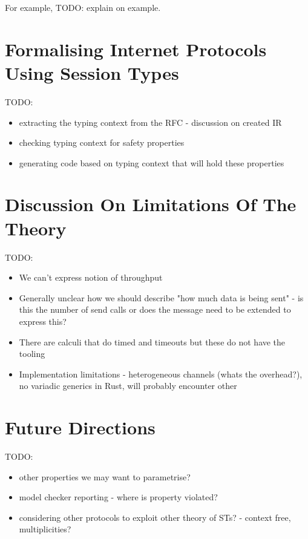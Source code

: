 \documentclass{article}
\newcommand{\todo}[1]{}
\renewcommand{\todo}[1]{{\color{red} TODO: {#1}}}
\begin{document}
For example, \todo{explain on example}.

\section{Formalising Internet Protocols Using Session Types}

\todo{
    \begin{itemize}
        \item extracting the typing context from the RFC - discussion on created IR
        \item checking typing context for safety properties
        \item generating code based on typing context that will hold these properties
    \end{itemize}
}

\section{Discussion On Limitations Of The Theory}

\todo{
    \begin{itemize}
        \item We can't express notion of throughput
        \item Generally unclear how we should describe "how much data is being sent" - is this the number of send calls or does the message need to be extended to express this?
        \item There are calculi that do timed and timeouts but these do not have the tooling
        \item Implementation limitations - heterogeneous channels (whats the overhead?), no variadic generics in Rust, will probably encounter other
    \end{itemize}
}

\section{Future Directions}

\todo{
    \begin{itemize}
        \item other properties we may want to parametrise?
        \item model checker reporting - where is property violated?
        \item considering other protocols to exploit other theory of STs? - context free, multiplicities?
    \end{itemize}
}
\end{document}
